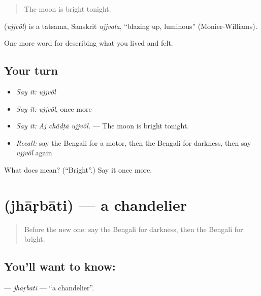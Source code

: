 \begin{quote}
The moon is bright tonight.
\end{quote}

\begin{cousinweb}
\textbf{} (\emph{ujjvôl}) is a tatsama, Sanskrit \emph{ujjvala}, \textquotedblleft{}blazing up, luminous\textquotedblright{} (Monier-Williams).
\end{cousinweb}

\begin{grammarlens}[title={What you've built}]
One more word for describing what you lived and felt.
\end{grammarlens}

\subsection*{Your turn}
\begin{itemize}
\raggedright
  \item \emph{Say it:} \emph{ujjvôl}
  \item \emph{Say it:} \emph{ujjvôl}, once more
  \item \emph{Say it:} \emph{Āj chā̃dṭā ujjvôl.} — The moon is bright tonight.
  \item \emph{Recall:} say the Bengali for a motor, then the Bengali for darkness, then say \emph{ujjvôl} again
\end{itemize}

\begin{tcolorbox}[breakable,colback=teal!4,colframe=teal!35!black,title={Before you move on}]
What does  mean? (\textquotedblleft{}Bright\textquotedblright{}.) Say it once more.
\end{tcolorbox}
\section[\texorpdfstring{\bn{ঝাড়বাতি} (jhāṛbāti)}{ঝাড়বাতি (jhāṛbāti)}]{ (jhāṛbāti) — a chandelier}

\label{lesson:BN-C505-jharbati}



\begin{quote}
Before the new one: say the Bengali for darkness, then the Bengali for bright.
\end{quote}

\subsection*{You'll want to know: }
\textbf{} — \emph{jhāṛbāti} — \textquotedblleft{}a chandelier\textquotedblright{}.

